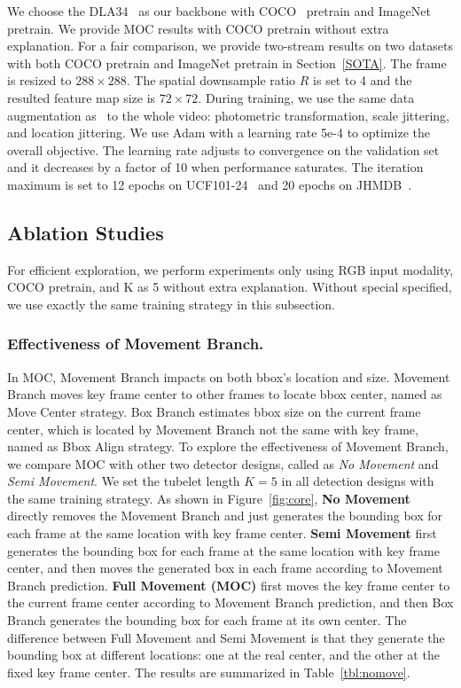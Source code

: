 \documentclass[runningheads]{llncs}
\begin{document}
We choose the DLA34~\cite{DLA} as our backbone with COCO~\cite{lin2014microsoft} pretrain and ImageNet~\cite{deng2009imagenet} pretrain. We provide MOC results with COCO pretrain without extra explanation. For a fair comparison, we provide two-stream results on two datasets with both COCO pretrain and ImageNet pretrain in Section~\ref{SOTA}. The frame is resized to $288 \times 288$. The spatial downsample ratio $R$ is set to 4 and the resulted feature map size is $72 \times 72$. During training, we use the same data augmentation as~\cite{kalogeiton2017action} to the whole video: photometric transformation, scale jittering, and location jittering. We use Adam with a learning rate 5e-4 to optimize the overall objective. The learning rate adjusts to convergence on the validation set and it decreases by a factor of 10 when performance saturates. The iteration maximum is set to 12 epochs on UCF101-24~\cite{UCF101} and 20 epochs on JHMDB~\cite{JHMDB}.

\subsection{Ablation Studies}\label{Ablation Study}
For efficient exploration, we perform experiments only using RGB input modality, COCO pretrain, and K as 5 without extra explanation. Without special specified, we use exactly the same training strategy in this subsection.

\subsubsection{Effectiveness of Movement Branch.}

In MOC, Movement Branch impacts on both bbox's location and size. Movement Branch moves key frame center to other frames to locate bbox center, named as Move Center strategy. Box Branch estimates bbox size on the current frame center, which is located by Movement Branch not the same with key frame, named as Bbox Align strategy. To explore the effectiveness of Movement Branch, we compare MOC with other two detector designs, called as {\em No Movement} and {\em Semi Movement}. We set the tubelet length $K = 5$ in all detection designs with the same training strategy. As shown in Figure~\ref{fig:core}, \textbf{No Movement} directly removes the Movement Branch and just generates the bounding box for each frame at the same location with key frame center. \textbf{Semi Movement} first generates the bounding box for each frame at the same location with key frame center, and then moves the generated box in each frame according to Movement Branch prediction.  \textbf{Full Movement (MOC)} first moves the key frame center to the current frame center according to Movement Branch prediction, and then Box Branch generates the bounding box for each frame at its own center. The difference between Full Movement and Semi Movement is that they generate the bounding box at different locations: one at the real center, and the other at the fixed key frame center. The results are summarized in Table~\ref{tbl:nomove}.
\end{document}
